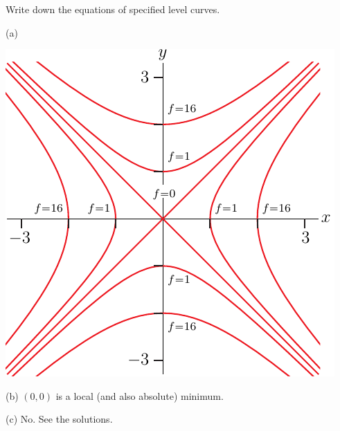 \begin{hint}
Write down the equations of specified level curves.
\end{hint}

\begin{answer}
(a)
\begin{center}
     \includegraphics[scale=0.8]{fig/OE05D_5.pdf}
\end{center}

(b) $(0,0)$ is a local (and also absolute) minimum.

(c) No. See the solutions.
\end{answer}

